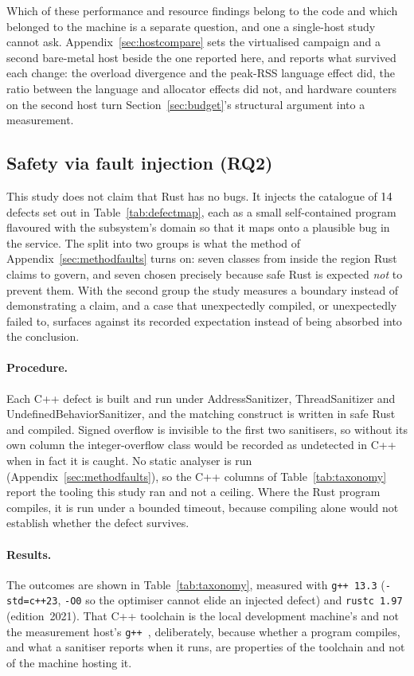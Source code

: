 \documentclass[english,oneside,a4paper,censored,csm,software-track-2020]{HYthesisML}
\begin{document}
Which of these performance and resource findings belong to the code and which belonged to the
machine is a separate question, and one a single-host study cannot ask.
Appendix~\ref{sec:hostcompare} sets the virtualised campaign and a second bare-metal host beside
the one reported here, and reports what survived each change: the overload divergence and the
peak-RSS language effect did, the ratio between the language and allocator effects did not, and
hardware counters on the second host turn Section~\ref{sec:budget}'s structural argument into a
measurement.

\subsection{Safety via fault injection (RQ2)}\label{sec:safetyresults}
This study does not claim that Rust has no bugs. It injects the catalogue of $14$
defects set out in Table~\ref{tab:defectmap}, each as a small self-contained program flavoured
with the subsystem's domain so that it maps onto a plausible bug in the service. The split into
two groups is what the method of Appendix~\ref{sec:methodfaults} turns on: seven classes from
inside the region Rust claims to govern, and seven chosen precisely because safe Rust is expected
\emph{not} to prevent them. With the second group the study measures a boundary instead of
demonstrating a claim, and a case that unexpectedly compiled, or unexpectedly failed to, surfaces
against its recorded expectation instead of being absorbed into the conclusion.

\paragraph{Procedure.}
Each C++ defect is built and run under AddressSanitizer, ThreadSanitizer and
UndefinedBehaviorSanitizer, and the matching construct is written in safe Rust and compiled.
Signed overflow is invisible to the first two sanitisers, so without its own column the
integer-overflow class would be recorded as undetected in C++ when in fact it is caught. No
static analyser is run (Appendix~\ref{sec:methodfaults}), so the C++ columns of
Table~\ref{tab:taxonomy} report the tooling this study ran and not a ceiling. Where the Rust
program compiles, it is run under a bounded timeout, because compiling alone would not establish
whether the defect survives.

\paragraph{Results.}
The outcomes are shown in Table~\ref{tab:taxonomy}, measured with \texttt{g++~13.3}
(\texttt{-std=c++23}, \texttt{-O0} so the optimiser cannot elide an injected defect) and
\texttt{rustc~1.97} (edition~2021). That C++ toolchain is the local development machine's and not
the measurement host's \texttt{g++~\MainGpp}, deliberately, because whether a program compiles,
and what a sanitiser reports when it runs, are properties of the toolchain and not of the machine
hosting it.
\end{document}
